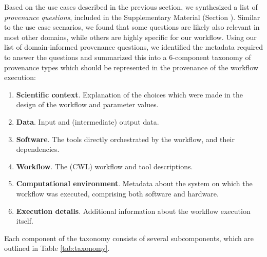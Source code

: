 \label{sec:user_req}

Based on the use cases described in the previous section, we synthesized a list of \emph{provenance questions}, included in the Supplementary Material (Section \emph{}).
Similar to the use case scenarios, we found that some questions are likely also relevant in most other domains, while others are highly specific for our workflow. Using our list of domain-informed provenance questions, we identified the metadata required to answer the questions and summarized this into a 6-component taxonomy of provenance types which should be represented in the provenance of the workflow execution: 


\begin{enumerate}[label=\textbf{T\arabic*}]
    \item \textbf{Scientific context}. Explanation of the choices which were made in the design of the workflow and parameter values. \label{tax:context}
    \item \textbf{Data}. Input and (intermediate) output data.\label{tax:data} %
    \item \textbf{Software}. The tools directly orchestrated by the workflow, and their dependencies. \label{tax:software} %
    \item \textbf{Workflow}. The (CWL) workflow and tool descriptions. \label{tax:wf} %
    \item \textbf{Computational environment}. Metadata about the system on which the workflow was executed, comprising both software and hardware. \label{tax:env} %
    \item \textbf{Execution details}. Additional information about the workflow execution itself. \label{tax:execution}
\end{enumerate}

Each component of the taxonomy consists of several subcomponents, which are outlined in Table \ref{tab:taxonomy}.